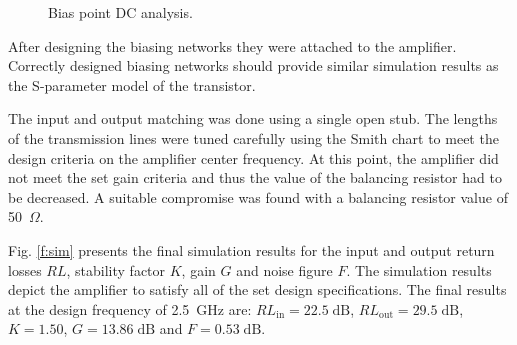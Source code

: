 \documentclass[a4paper, 12pt]{article}
\newcommand{\dB}{\ensuremath{\mathrm{dB}}}
\begin{document}
\begin{figure}[!h]
	\centering
	\caption{Bias point DC analysis.}
	\label{f:bias}
\end{figure}

After designing the biasing networks they were attached to the amplifier. 
Correctly designed biasing networks should provide similar simulation results 
as the S-parameter model of the transistor.

The input and output matching was done using a single open stub. The lengths 
of the transmission lines were tuned carefully using the Smith chart to meet 
the design criteria on the amplifier center frequency. At this point, the 
amplifier did not meet the set gain criteria and thus the value of the balancing 
resistor had to be decreased. A suitable compromise was found with a balancing 
resistor value of 50~$\Omega$. 

Fig. \ref{f:sim} presents the final simulation results for the input 
and output return losses $RL$, stability factor $K$, gain $G$ and noise figure 
$F$. The simulation results depict the amplifier to satisfy all of the set design 
specifications. The final results at the design frequency of 2.5~GHz are: 
$\textit{RL}_\mathrm{in} = 22.5 \;\dB$, $\textit{RL}_\mathrm{out} = 29.5 \;\dB$, 
$K = 1.50$, $G = 13.86 \;\dB$ and $F = 0.53 \;\dB$.
\end{document}
